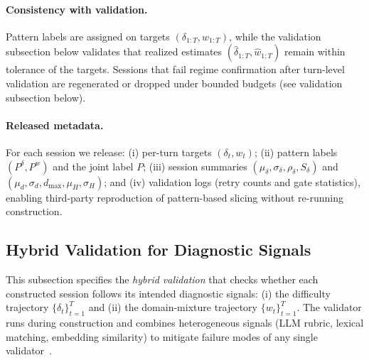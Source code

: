 \paragraph{Consistency with validation.}
Pattern labels are assigned on targets $(\delta_{1:T}, w_{1:T})$, while the validation subsection below validates that realized estimates $(\hat{\delta}_{1:T}, \hat{w}_{1:T})$ remain within tolerance of the targets.
Sessions that fail regime confirmation after turn-level validation are regenerated or dropped under bounded budgets (see validation subsection below).

\paragraph{Released metadata.}
For each session we release:
(i) per-turn targets $(\delta_t, w_t)$;
(ii) pattern labels $(P^\delta, P^w)$ and the joint label $P$;
(iii) session summaries $(\mu_\delta,\sigma_\delta,\rho_\delta,S_\delta)$ and $(\mu_d,\sigma_d,d_{\max},\mu_H,\sigma_H)$;
and (iv) validation logs (retry counts and gate statistics), enabling third-party reproduction of pattern-based slicing without re-running construction.

\subsection{Hybrid Validation for Diagnostic Signals}
\label{app:signals}

This subsection specifies the \emph{hybrid validation} that checks whether each constructed session follows its intended diagnostic signals: (i) the difficulty trajectory $\{\delta_t\}_{t=1}^{T}$ and (ii) the domain-mixture trajectory $\{w_t\}_{t=1}^{T}$. The validator runs during construction and combines heterogeneous signals (LLM rubric, lexical matching, embedding similarity) to mitigate failure modes of any single validator~\citep{zheng-etal-2023-judging,laskar-etal-2024-systematic,deng-etal-2024-investigating,chiang-etal-2024-chatbotarena}.

